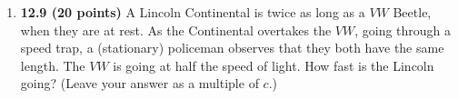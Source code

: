 \documentclass[fleqn]{article}
\begin{document}
\begin{enumerate}
{        \\
        $
          \beta \equiv \dfrac{v}{c} \approxeq 1
          \\
          \\
          \text{For lecture we had } \beta=1-\epsilon, \text{assuming } \epsilon \text{is very very small.}
          \\
          \\
          \\
          \dfrac{-1+\sqrt{1+15 (1-\epsilon)^2}}{3 (1-\epsilon)}
          =\dfrac{-1+\sqrt{1+15 (1-\epsilon)^2}}{3} (1+\epsilon)
          =\dfrac{-1+\sqrt{16-30 \epsilon}}{3} (1+\epsilon)
          \\
          \\
          \\
          =(1-\dfrac{5}{4} \epsilon) (1+\epsilon)
          =1-\dfrac{1}{4} \epsilon
          \\
          \\
          \\
          \therefore ~~~ \theta_{max} \approxeq 0 \Longrightarrow cos \theta_{max} \approxeq1-\dfrac{1}{4} \theta^2_{max}
          \\
          \\
          \\
          \Longrightarrow \theta_{max}=\sqrt{\dfrac{\epsilon}{2}}
          \\
          \\
          \\
          \therefore ~~~ \boxed{
            \theta_{max}=\sqrt{\dfrac{(1-\beta)}{2}}
          } ~~~~ \checkmark
          \\
          \\
        $
      }

    \item \textbf{12.9 (20 points)} A Lincoln Continental is twice as long as a $VW$ Beetle, when they
    are at rest. As the Continental overtakes the $VW$, going through a speed trap, a
    (stationary) policeman observes that they both have the same length. The $VW$ is
    going at half the speed of light. How fast is the Lincoln going? (Leave your answer
    as a multiple of $c$.)



\end{enumerate}
\end{document}
